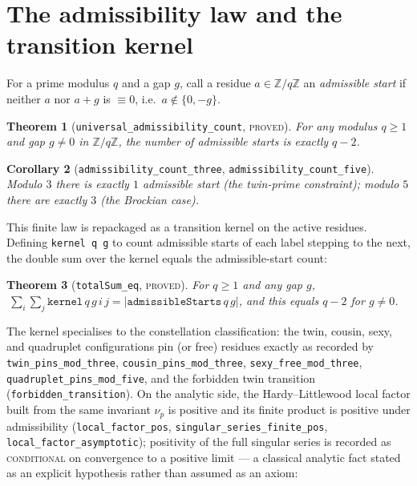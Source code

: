 \documentclass[11pt]{article}
\newtheorem{theorem}{Theorem}[section]
\newtheorem{corollary}[theorem]{Corollary}
\theoremstyle{definition}
\theoremstyle{remark}
\newcommand{\ZmodQ}{\mathbb{Z}/q\mathbb{Z}}
\newcommand{\lean}[1]{\texttt{#1}}
\begin{document}
\section{The admissibility law and the transition kernel}\label{sec:admissibility}

For a prime modulus $q$ and a gap $g$, call a residue $a\in\ZmodQ$ an \emph{admissible start}
if neither $a$ nor $a+g$ is $\equiv 0$, i.e.\ $a\notin\{0,-g\}$.

\begin{theorem}[\lean{universal\_admissibility\_count}, \textsc{proved}]\label{thm:qnu}
For any modulus $q\ge 1$ and gap $g\neq 0$ in $\ZmodQ$, the number of admissible starts is
exactly $q-2$.
\end{theorem}

\begin{corollary}[\lean{admissibility\_count\_three}, \lean{admissibility\_count\_five}]
Modulo $3$ there is exactly $1$ admissible start (the twin-prime constraint); modulo $5$ there
are exactly $3$ (the Brockian case).
\end{corollary}

This finite law is repackaged as a transition kernel on the active residues. Defining
\lean{kernel q g} to count admissible starts of each label stepping to the next, the double sum
over the kernel equals the admissible-start count:

\begin{theorem}[\lean{totalSum\_eq}, \textsc{proved}]
For $q\ge1$ and any gap $g$, $\ \sum_i\sum_j \lean{kernel}\,q\,g\,i\,j
=\lvert\lean{admissibleStarts}\,q\,g\rvert$, and this equals $q-2$ for $g\neq0$.
\end{theorem}

\noindent The kernel specialises to the constellation classification: the twin, cousin, sexy,
and quadruplet configurations pin (or free) residues exactly as recorded by
\lean{twin\_pins\_mod\_three}, \lean{cousin\_pins\_mod\_three}, \lean{sexy\_free\_mod\_three},
\lean{quadruplet\_pins\_mod\_five}, and the forbidden twin transition
(\lean{forbidden\_transition}). On the analytic side, the Hardy--Littlewood local factor built
from the same invariant $\nu_p$ is positive and its finite product is positive under
admissibility (\lean{local\_factor\_pos}, \lean{singular\_series\_finite\_pos},
\lean{local\_factor\_asymptotic}); positivity of the full singular series is recorded as
\textsc{conditional} on convergence to a positive limit --- a classical analytic fact stated as
an explicit hypothesis rather than assumed as an axiom:
\end{document}
